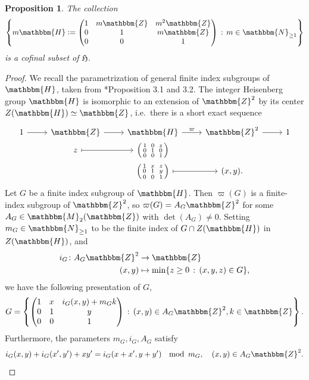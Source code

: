\documentclass{amsart}
\numberwithin{figure}{section}
\numberwithin{equation}{section}
\numberwithin{table}{section}
\theoremstyle{plain}
\newtheorem{proposition}[equation]{Proposition}
\theoremstyle{definition}
\theoremstyle{remark}
\theoremstyle{nonumber}
\newcommand{\N}{\mathbb{N}}
\newcommand{\Z}{\mathbb{Z}}
\newcommand{\Mat}{\mathbb{M}}
\newcommand{\HH}{\mathbb{H}} %
\newcommand{\defeq}{\mathrel{\vcentcolon=}}
\renewcommand{\mathbb}{\mathbbm} %
\begin{document}
\begin{proposition}\label{prop:Heis.cofinal}
The collection 
\begin{equation}\label{eq:Heis_cofinal_subset}
\left\{m\HH\defeq \begin{pmatrix} 
1 & m\Z & m^2\Z \\ 0 & 1 & m\Z \\ 0 & 0 & 1\end{pmatrix}\,:\,m\in\N_{\geq 1}\right\}
\end{equation}
is a cofinal subset of $\mathfrak{H}$.
\end{proposition}
\begin{proof}
We recall the parametrization of general finite index subgroups of $\HH$, taken from
\cite{Lightwood-Sahin-Ugarcovici:Heisenberg_odometers}*{Proposition 3.1 and
3.2}. The integer Heisenberg group \( \HH \) is isomorphic to
an extension of \( \Z^2 \) by its center 
\( Z(\HH)\simeq\Z \), i.e.~there is a short exact sequence
\[ 
  \begin{tikzcd}[row sep=0]
  1 \arrow[r] & \Z \arrow[r] & \HH \arrow[r,"\varpi"] & \Z^2 \arrow[r] & 1
  \\
  & z \arrow[r, mapsto] & \left(\begin{smallmatrix}
  1 & 0 & z \\ 0 & 1 & 0 \\ 0 & 0 & 1
  \end{smallmatrix}\right)
  & \\
  & & \left(\begin{smallmatrix}
  1 & x & z \\ 0 & 1 & y \\ 0 & 0 & 1
  \end{smallmatrix}\right) \arrow[r, mapsto] & (x,y).
  \end{tikzcd}
\]
Let $G$ be a finite index subgroup of $\HH$. Then $\varpi(G)$ is a finite-index subgroup of $\Z^2$, so $\varpi(G)=A_G\Z^2$ for some
$A_G\in\Mat_2(\Z)$ with $\det(A_G)\neq 0$. Setting $m_G\in \N_{\geq 1}$ to
be the finite index of $G\cap Z(\HH)$ in $Z(\HH)$, and 
\begin{align*}
i_G\colon A_G\Z^2 &\to \Z\\
(x,y)&\mapsto \min\{z\geq 0\,:\,(x,y,z)\in G\},
\end{align*}
we have the following presentation of $G$,
\begin{equation}\label{eq:finite.index.Heis.general}
G=\left\{\begin{pmatrix} 1 & x & i_G(x,y)+m_Gk\\ 0 & 1 & y \\ 0 &
  0 & 1 \end{pmatrix}\,:\,(x,y)\in A_G\Z^2, k\in\Z\right\}.
\end{equation}
Furthermore, the parameters $m_G, i_G, A_G$ satisfy
\begin{equation}\label{eq:normal.Heis.parameters}
i_G(x,y)+i_G(x^\prime,y^\prime)+xy^\prime =i_G(x+x^\prime,y+y^\prime)\;\mod\,m_G,\quad (x,y)\in A_G\Z^2.
\end{equation}


\end{proof}
\end{document}
